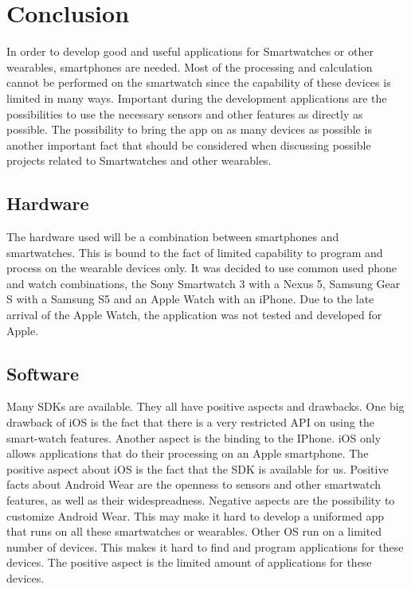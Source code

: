 \section{Conclusion}
In order to develop good and useful applications for Smartwatches or other wearables, smartphones are needed. Most of the processing and calculation cannot be performed on the smartwatch since the capability of these devices is limited in many ways.
Important during the development applications are the possibilities to use the necessary sensors and other features as directly as possible. 
The possibility to bring the app on as many devices as possible is another important fact that should be considered when discussing possible projects related to Smartwatches and other wearables. 

\subsection{Hardware}
The hardware used will be a combination between smartphones and smartwatches. This is bound to the fact of limited capability to program and process on the wearable devices only. It was decided to use common used phone and watch combinations, the Sony Smartwatch 3 with a Nexus 5, Samsung Gear S with a Samsung S5 and an Apple Watch with an iPhone. Due to the late arrival of the Apple Watch, the application was not tested and developed for Apple.

\subsection{Software}
Many SDKs are available. They all have positive aspects and drawbacks. 
One big drawback of iOS is the fact that there is a very restricted API on using the smart-watch features. Another aspect is the binding to the IPhone. iOS only allows applications that do their processing on an Apple smartphone.
The positive aspect about iOS is the fact that the SDK is available for us.
Positive facts about Android Wear are the openness to sensors and other smartwatch features, as well as their widespreadness. 
Negative aspects are the possibility to customize Android Wear. This may make it hard to develop a uniformed app that runs on all these smartwatches or wearables. 
Other OS run on a limited number of devices. This makes it hard to find and program applications for these devices. The positive aspect is the limited amount of applications for these devices.